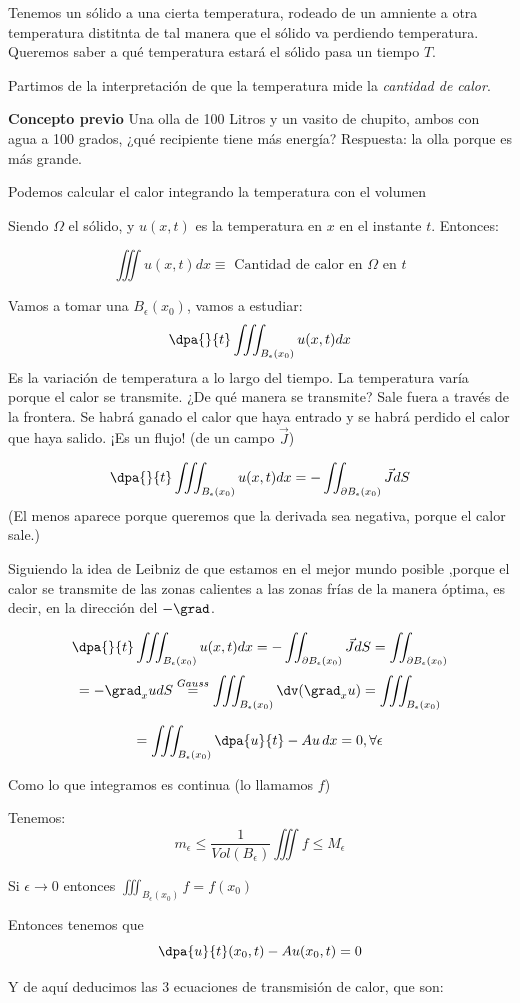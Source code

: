 \begin{example}
Tenemos un sólido a una cierta temperatura, rodeado de un amniente a otra temperatura distitnta de tal manera que el sólido va perdiendo temperatura. Queremos saber a qué temperatura estará el sólido pasa un tiempo $T$.

Partimos de la interpretación de que la temperatura mide la \emph{cantidad de calor}.

\textbf{Concepto previo} Una olla de 100 Litros y un vasito de chupito, ambos con agua a 100 grados, ¿qué recipiente tiene más energía? Respuesta: la olla porque es más grande.

Podemos calcular el calor integrando la temperatura con el volumen


Siendo $\Omega$ el sólido, y $u(x,t)$ es la temperatura en $x$ en el instante $t$. Entonces:

\[\iiint u(x,t) dx \equiv \text{ Cantidad de calor en }\Omega\text{ en }t\]

Vamos a tomar una $B_{\epsilon}(x_0)$, vamos a estudiar:
\[\dpa{}{t} \iiint_{B_{\epsilon}(x_0)} u(x,t)dx\]
 Es la variación de temperatura a lo largo del tiempo. La temperatura varía porque el calor se transmite. ¿De qué manera se transmite? Sale fuera a través de la frontera. Se habrá ganado el calor que haya entrado y se habrá perdido el calor que haya salido. ¡Es un flujo!
 (de un campo $\vec{J}$)

 \[\dpa{}{t} \iiint_{B_{\epsilon}(x_0)} u(x,t)dx = -\iint_{\partial B_{\epsilon}(x_0)} \vec{J}dS\]
 (El menos aparece porque queremos que la derivada sea negativa, porque el calor sale.)


 Siguiendo la idea de Leibniz de que estamos en el mejor mundo posible ,porque el calor se transmite de las zonas calientes a las zonas frías de la manera óptima, es decir, en la dirección del $-\grad$.


 \[\dpa{}{t} \iiint_{B_{\epsilon}(x_0)} u(x,t)dx = -\iint_{\partial B_{\epsilon}(x_0)} \vec{J}dS = \iint_{\partial B_{\epsilon}(x_0)}\]
 \[ = -\grad_x u dS \stackrel{Gauss}{=} \iiint_{B_{\epsilon}(x_0)} \dv(\grad_x u) = \iiint_{B_{\epsilon}(x_0)}  \]

\[ = \iiint_{B_{\epsilon}(x_0)} \dpa{u}{t}-Au\,dx=0,\forall \epsilon\]

Como lo que integramos es continua (lo llamamos $f$)

Tenemos:
\[m_{\epsilon} \leq \frac{1}{Vol(B_{\epsilon})} \iiint f \leq M_{\epsilon}\]

Si $\epsilon \to 0$ entonces $\displaystyle\iiint_{B_{\epsilon}(x_0)} f = f(x_0)$

Entonces tenemos que \[\dpa{u}{t}(x_0,t) - Au(x_0,t) = 0\]

Y de aquí deducimos las 3 ecuaciones de transmisión de calor, que son:
 \end{example}

